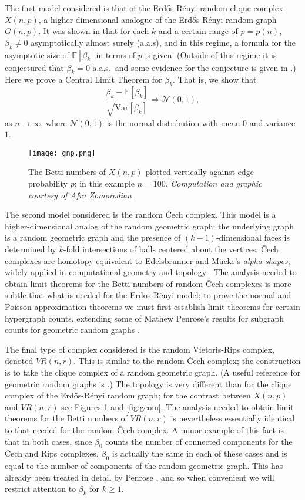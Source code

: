\documentclass{amsart}
\theoremstyle{definition}
\newcommand{\E}{\mathbb{E}}
\newcommand{\var}{\mathrm{Var}}
\renewcommand{\1}{\mathbb{1}}
\begin{document}
The first model considered is that of the Erd\H{o}s-R\'enyi random clique complex $X(n,p)$,
a higher dimensional analogue of the Erd\H{o}s-R\'enyi random graph
$G(n,p)$.  It was shown in \cite{clique} that for each $k$ and a
certain range of $p=p(n)$, $\beta_k \neq 0$ asymptotically almost surely (a.a.s\.), and in this regime, a formula for the
asymptotic size of $\E[\beta_k]$in terms of $p$ is given.
(Outside of this regime it is conjectured that $\beta_k =0 $ a.a.s.\, and some evidence for the conjecture is given in \cite{clique}.)
Here we prove
 a Central Limit Theorem for $\beta_k$. That is, we show that $$ \frac{ \beta_k -
    \E[\beta_k] }{ \sqrt{\var [ \beta_k]}} \Rightarrow
  \mathcal{N}(0,1),$$ as $n \to \infty$, where $\mathcal{N}(0,1)$ is
  the normal distribution with mean $0$ and variance $1$.

\begin{figure}\label{ER-fig}
\begin{centering}
\texttt{[image: gnp.png]}
\end{centering}
\caption{The Betti numbers of $X(n,p)$ plotted vertically against edge
  probability $p$; in this example $n=100$. \emph{Computation and
    graphic courtesy of Afra Zomorodian.}}
\label{fig:gnp}
\end{figure}

The second model considered is the random \v{C}ech complex.
This model is a higher-dimensional analog of the random geometric graph;
the underlying graph is 
a random geometric graph and the presence of 
$(k-1)$-dimensional faces is determined by
$k$-fold intersections of balls centered about the vertices. \v{C}ech complexes are homotopy
equivalent to Edelsbrunner and M\"{u}cke's {\it alpha shapes}, widely
applied in computational geometry and topology \cite{alpha}. The
analysis needed to obtain limit theorems for the Betti numbers
of random \v{C}ech complexes 
is more subtle that what is needed for 
the Erd\"os-R\'enyi model; to prove the
normal and Poisson approximation theorems we must first establish limit
theorems for certain hypergraph counts, extending some of Mathew
Penrose's results for subgraph counts for geometric random graphs
\cite{penrose}.

The final type of complex considered
 is the random Vietoris-Rips complex, denoted $VR(n,r)$. This is similar to the random \v{C}ech complex; 
the construction is to take the clique complex of a random geometric
graph.  (A useful 
reference for geometric random graphs is
\cite{penrose}.) The topology is very different than for the clique complex of the Erd\H{o}s-R\'enyi random graph;
for the contrast between $X(n,p)$ and $VR(n,r)$ see Figures
\ref{fig:gnp} and \ref{fig:geom}.  The analysis needed to obtain limit theorems
for the Betti numbers of $VR(n,r)$ is nevertheless
essentially identical to that needed
for the random \v{C}ech complex.  A minor example of this fact is that
in both cases, since $\beta_0$ counts the number of connected components 
for the \v{C}ech and Rips complexes, $\beta_0$ is actually the same in
each of these cases and
is equal to the number of components of the random geometric graph. 
This has already been treated in
detail by Penrose \cite{penrose}, and so when convenient we will restrict 
attention to $\beta_k$ for $k\ge 1$.
\end{document}
